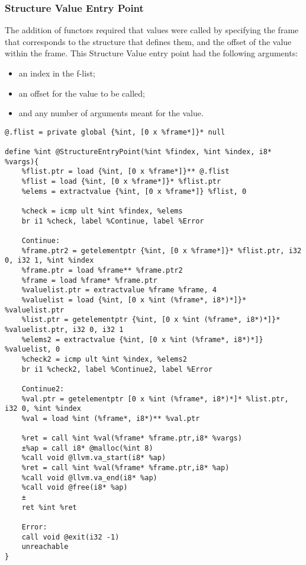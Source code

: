 \subsubsection{Structure Value Entry Point}
The addition of functors required that values were called by specifying the frame that corresponds to the structure that defines them, and the offset of the value within the frame.
This Structure Value entry point had the following arguments:
\begin{itemize}
\item an index in the f-list;
\item an offset for the value to be called;
\item and any number of arguments meant for the value.
\end{itemize}

\begin{lstlisting}
@.flist = private global {%int, [0 x %frame*]}* null

define %int @StructureEntryPoint(%int %findex, %int %index, i8* %vargs){
    %flist.ptr = load {%int, [0 x %frame*]}** @.flist
    %flist = load {%int, [0 x %frame*]}* %flist.ptr
    %elems = extractvalue {%int, [0 x %frame*]} %flist, 0
    
    %check = icmp ult %int %findex, %elems
    br i1 %check, label %Continue, label %Error
    
    Continue:
    %frame.ptr2 = getelementptr {%int, [0 x %frame*]}* %flist.ptr, i32 0, i32 1, %int %index
    %frame.ptr = load %frame** %frame.ptr2
    %frame = load %frame* %frame.ptr
    %valuelist.ptr = extractvalue %frame %frame, 4
    %valuelist = load {%int, [0 x %int (%frame*, i8*)*]}* %valuelist.ptr
    %list.ptr = getelementptr {%int, [0 x %int (%frame*, i8*)*]}* %valuelist.ptr, i32 0, i32 1
    %elems2 = extractvalue {%int, [0 x %int (%frame*, i8*)*]} %valuelist, 0
    %check2 = icmp ult %int %index, %elems2
    br i1 %check2, label %Continue2, label %Error
    
    Continue2:
    %val.ptr = getelementptr [0 x %int (%frame*, i8*)*]* %list.ptr, i32 0, %int %index
    %val = load %int (%frame*, i8*)** %val.ptr
    
    %ret = call %int %val(%frame* %frame.ptr,i8* %vargs)
    ±%ap = call i8* @malloc(%int 8)
    %call void @llvm.va_start(i8* %ap)
    %ret = call %int %val(%frame* %frame.ptr,i8* %ap)
    %call void @llvm.va_end(i8* %ap)
    %call void @free(i8* %ap)
    ±
    ret %int %ret
    
    Error:
    call void @exit(i32 -1)
    unreachable
}
\end{lstlisting}
